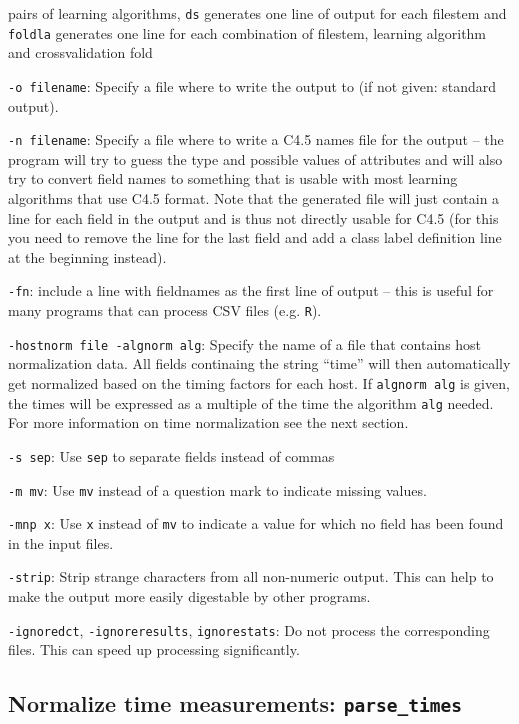 \documentclass[a4paper,10pt,twoside]{article}
\newenvironment{optionlist}
{\begin{list}{}
    {\setlength{\itemsep}{0em plus0em minus0ex}
      \setlength{\parsep}{0ex}
      \setlength{\topsep}{0em}
      \setlength{\leftmargin}{2em}
      \setlength{\listparindent}{0em}
      \setlength{\itemindent}{-2em}
      \setlength{\partopsep}{0ex}
    }}
  {\end{list}}
\begin{document}
\begin{optionlist}
  pairs of learning algorithms,
  \verb=ds= generates one line of output for each filestem and 
  \verb=foldla= generates one line for each combination of filestem, 
  learning algorithm and crossvalidation fold 
\item \verb=-o filename=: Specify a file where to write the output
  to (if not given: standard output).
\item \verb=-n filename=: Specify a file where to write a C4.5 names
  file for the output -- the program will try to guess the type and 
  possible values of attributes and will also try to convert 
  field names to something that is usable with most learning algorithms
  that use C4.5 format.  Note that the generated file will just 
  contain a line for each field in the output and is thus not
  directly usable for C4.5 (for this you need to remove the line 
  for the last field and add a class label definition line at the 
  beginning instead).
\item \verb=-fn=: include a line with fieldnames as the first line of
  output -- this is useful for many programs that can process CSV files
 (e.g. \texttt{R}).
\item \verb=-hostnorm file -algnorm alg=: Specify the name of a file that contains
  host normalization data. All fields continaing the string ``time''
  will then automatically get normalized based on the timing factors
  for each host.  If \verb=algnorm alg= is given, the times will
  be expressed as a multiple of the time the algorithm \verb=alg= needed.
  For more information on time normalization see the next section.
\item \verb=-s sep=: Use \verb=sep= to separate fields instead of commas
\item \verb=-m mv=: Use \verb=mv= instead of a question mark to indicate
  missing values.
\item \verb=-mnp x=: Use \verb=x= instead of \verb=mv= to indicate a value 
  for which no field has been found in the input files.
\item \verb=-strip=: Strip strange characters from all non-numeric output.
  This can help to make the output more easily digestable by other programs.
\item \verb=-ignoredct=, \verb=-ignoreresults=, \verb=ignorestats=: Do not process the corresponding files. This can speed up processing significantly.
\end{optionlist}


\subsection{Normalize time measurements: \texttt{parse\_times} }
\end{document}

